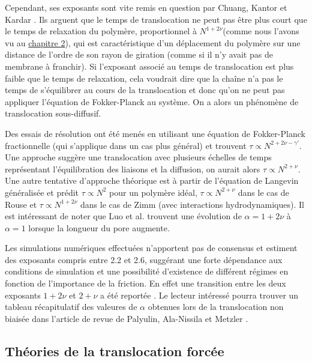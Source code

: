   Cependant, ses exposants sont vite remis en question par Chuang, Kantor et Kardar \cite{Chuang2001}. Ils arguent que le temps de translocation ne peut pas être plus court que le temps de relaxation du polymère, proportionnel à $N^{1+2\nu}$(comme nous l'avons vu au \hyperref[fluctudissip]{chapitre 2}), qui est caractéristique d'un déplacement du polymère sur une distance de l'ordre de son rayon de giration (comme si il n'y avait pas de membrane à franchir). Si l'exposant associé au temps de translocation est plus faible que le temps de relaxation, cela voudrait dire que la chaîne n'a pas le temps de s'équilibrer au cours de la translocation et donc qu'on ne peut pas appliquer l'équation de Fokker-Planck au système. On a alors un phénomène de translocation sous-diffusif.
  
   Des essais de résolution ont été menés en utilisant une équation de Fokker-Planck fractionnelle \cite{Metzler2003} (qui s'applique dans un cas plus général) et trouvent $\tau \propto N^{2+2\nu-\gamma'}$. Une approche suggère une translocation avec plusieurs échelles de temps représentant l'équilibration des liaisons et la diffusion, on aurait alors $\tau \propto N^{2+\nu}$. Une autre tentative d'approche théorique est à partir de l'équation de Langevin généralisée \cite{Panja2010} et prédit $\tau \propto N^2$ pour un polymère idéal, $\tau \propto N^{2+\nu}$ dans le cas de Rouse et $\tau \propto N^{1+2\nu}$ dans le cas de Zimm (avec interactions hydrodynamiques). Il est intéressant de noter que Luo et al. \cite{2Luo2006} trouvent une évolution de $\alpha=1+2\nu$ à $\alpha=1$ lorsque la longueur du pore augmente.
   
   Les simulations numériques effectuées n'apportent pas de consensus et estiment des exposants compris entre 2.2 et 2.6, suggérant une forte dépendance aux conditions de simulation et une possibilité d'existence de différent régimes en fonction de l'importance de la friction. En effet une transition entre les deux exposants $1+2\nu$ et $2+\nu$ a été reportée \cite{Panja22010}. Le lecteur intéressé pourra trouver un tableau récapitulatif des valeures de $\alpha$ obtenues lors de la translocation non biaisée dans l'article de revue de Palyulin, Ala-Nissila et Metzler \cite{Palyulin2014}.\\

\subsection{Théories de la translocation forcée}

